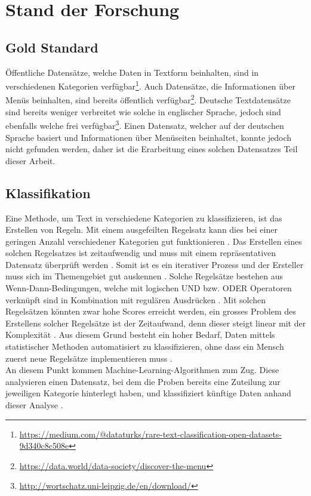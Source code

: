\chapter{Stand der Forschung}
\section{Gold Standard}
Öffentliche Datensätze, welche Daten in Textform beinhalten, sind in verschiedenen Kategorien verfügbar\footnote{\url{https://medium.com/@dataturks/rare-text-classification-open-datasets-9d340c8c508e}}.
Auch Datensätze, die Informationen über Menüs beinhalten, sind bereits öffentlich verfügbar\footnote{\url{https://data.world/data-society/discover-the-menu}}.
Deutsche Textdatensätze sind bereits weniger verbreitet wie solche in englischer Sprache, jedoch sind ebenfalls welche frei verfügbar\footnote{\url{http://wortschatz.uni-leipzig.de/en/download/}}.
Einen Datensatz, welcher auf der deutschen Sprache basiert und Informationen über Menüseiten beinhaltet, konnte jedoch nicht gefunden werden, daher ist die Erarbeitung eines solchen Datensatzes Teil dieser Arbeit.
\section{Klassifikation}
Eine Methode, um Text in verschiedene Kategorien zu klassifizieren, ist das Erstellen von Regeln.
Mit einem ausgefeilten Regelsatz kann dies bei einer geringen Anzahl verschiedener Kategorien gut funktionieren \cite[p.125]{jackson2007natural}.
Das Erstellen eines solchen Regelsatzes ist zeitaufwendig und muss mit einem repräsentativen Datensatz überprüft werden \cite[p.125]{jackson2007natural}.
Somit ist es ein iterativer Prozess und der Ersteller muss sich im Themengebiet gut auskennen \cite[p.125]{jackson2007natural}.
Solche Regelsätze bestehen aus \glqq Wenn-Dann\grqq-Bedingungen, welche mit logischen \glqq UND\grqq{} bzw. \glqq ODER\grqq{} Operatoren verknüpft sind in Kombination mit regulären Ausdrücken \cite[p.126]{jackson2007natural}.
Mit solchen Regelsätzen könnten zwar hohe Scores erreicht werden, ein grosses Problem des Erstellens solcher Regelsätze ist der Zeitaufwand, denn dieser steigt linear mit der Komplexität \cite[p.127]{jackson2007natural}.
Aus diesem Grund besteht ein hoher Bedarf, Daten mittels statistischer Methoden automatisiert zu klassifizieren, ohne dass ein Mensch zuerst neue Regelsätze implementieren muss \cite[p.127]{jackson2007natural}.\\
An diesem Punkt kommen Machine-Learning-Algorithmen zum Zug.
Diese analysieren einen Datensatz, bei dem die Proben bereits eine Zuteilung zur jeweiligen Kategorie hinterlegt haben, und klassifiziert künftige Daten anhand dieser Analyse \cite[p.127]{jackson2007natural}. 

